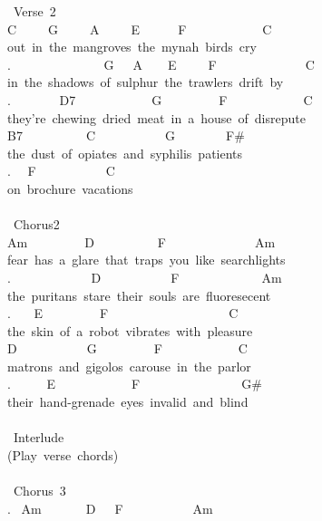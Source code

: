 {\lbrack\ Verse\ 2\rbrack\\
C\ \ \ \ \ G\ \ \ \ \ A\ \ \ \ \ E\ \ \ \ \ \ F\ \ \ \ \ \ \ \ \ \ \ \ C\\
out\ in\ the\ mangroves\ the\ mynah\ birds\ cry\\
. \ \ \ \ \ \ \ \ \ \ \ \ \ \ G\ \ \ A\ \ \ \ E\ \ \ \ \ F\ \ \ \ \ \ \ \ \ \ \ \ \ \ C\\
in\ the\ shadows\ of\ sulphur\ the\ trawlers\ drift\ by\\
. \ \ \ \ \ \ \ D7\ \ \ \ \ \ \ \ \ \ \ \ G\ \ \ \ \ \ \ \ \ F\ \ \ \ \ \ \ \ \ \ \ \ C\\
they're\ chewing\ dried\ meat\ in\ a\ house\ of\ disrepute\\
B7\ \ \ \ \ \ \ \ \ \ C\ \ \ \ \ \ \ \ \ \ \ G\ \ \ \ \ \ \ \ F\#\\
the\ dust\ of\ opiates\ and\ syphilis\ patients\\
. \ \ F\ \ \ \ \ \ \ \ \ \ \ C\ \\
on\ brochure\ vacations\\
\\
\lbrack\ Chorus2\rbrack\\
Am\ \ \ \ \ \ \ \ \ D\ \ \ \ \ \ \ \ \ \ F\ \ \ \ \ \ \ \ \ \ \ \ \ \ Am\ \\
fear\ has\ a\ glare\ that\ traps\ you\ like\ searchlights\\
. \ \ \ \ \ \ \ \ \ \ \ \ D\ \ \ \ \ \ \ \ \ \ \ F\ \ \ \ \ \ \ \ \ \ \ \ \ Am\ \\
the\ puritans\ stare\ their\ souls\ are\ fluoresecent\\
. \ \ \ E\ \ \ \ \ \ \ \ \ F\ \ \ \ \ \ \ \ \ \ \ \ \ \ \ \ \ \ \ C\\
the\ skin\ of\ a\ robot\ vibrates\ with\ pleasure\\
D\ \ \ \ \ \ \ \ \ \ \ G\ \ \ \ \ \ \ \ \ F\ \ \ \ \ \ \ \ \ \ \ \ C\\
matrons\ and\ gigolos\ carouse\ in\ the\ parlor\\
. \ \ \ \ \ E\ \ \ \ \ \ \ \ \ \ \ \ F\ \ \ \ \ \ \ \ \ \ \ \ \ \ \ \ G\#\ \ \\
their\ hand-grenade\ eyes\ invalid\ and\ blind\ \\
\\
\lbrack\ Interlude\rbrack\\
(Play\ verse\ chords)\\
\\
\lbrack\ Chorus\ 3\rbrack\\
. \ Am\ \ \ \ \ \ \ D\ \ \ F\ \ \ \ \ \ \ \ \ \ \ Am\ \ \\
}
